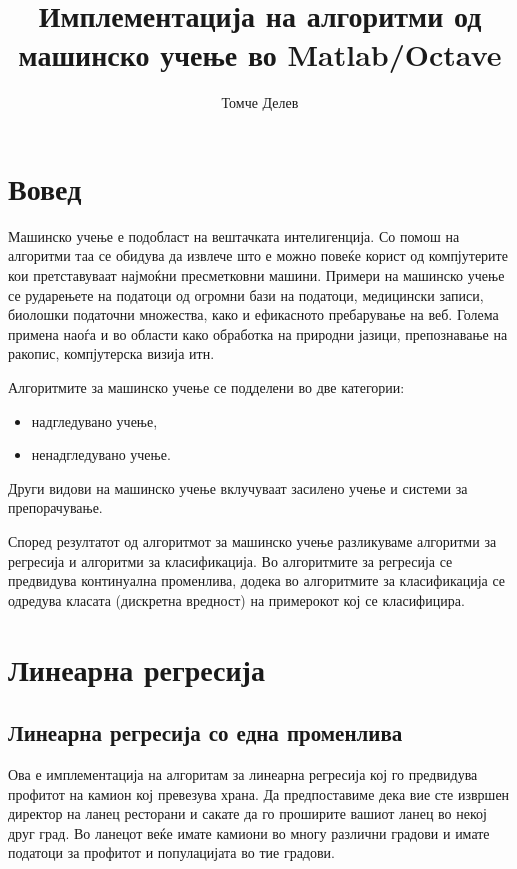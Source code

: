 \documentclass[12pt,a4paper]{article}
\begin{document}
\title{Имплементација на алгоритми од машинско учење во Matlab/Octave}

\author{Томче Делев}
\date{}

\maketitle

\section{Вовед}

Машинско учење е подобласт на вештачката интелигенција. Со помош на алгоритми
таа се обидува да извлече што е можно повеќе корист од компјутерите кои
претставуваат најмоќни пресметковни машини. Примери на машинско учење се
рударењете на податоци од огромни бази на податоци, медицински записи, биолошки
податочни множества, како и ефикасното пребарување на веб. Голема примена наоѓа
и во области како обработка на природни јазици, препознавање на ракопис,
компјутерска визија итн.

Алгоритмите за машинско учење се подделени во две категории:
\begin{itemize}
  \item надгледувано учење,
  \item ненадгледувано учење.
\end{itemize}
Други видови на машинско учење вклучуваат засилено учење и системи за
препорачување.

Според резултатот од алгоритмот за машинско учење разликуваме алгоритми за
регресија и алгоритми за класификација. Во алгоритмите за регресија се
предвидува континуална променлива, додека во алгоритмите за класификација се
одредува класата (дискретна вредност) на примерокот кој се класифицира.


\section{Линеарна регресија}

\subsection{Линеарна регресија со една променлива}
Ова е имплементација на алгоритам за линеарна регресија кој го предвидува
профитот на камион кој превезува храна. Да предпоставиме дека вие сте извршен
директор на ланец ресторани и сакате да го проширите вашиот ланец во некој
друг град. Во ланецот веќе имате камиони во многу различни градови и имате
податоци за профитот и популацијата во тие градови. 
\end{document}
